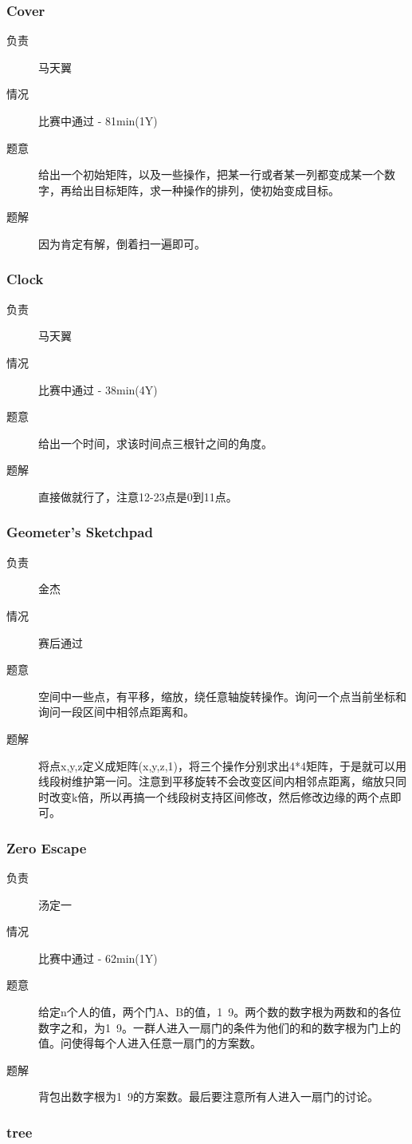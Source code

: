 \documentclass[a4paper, 11pt, nofonts, nocap, fancyhdr]{ctexart}
\newcommand{\problem}[1]{\subsubsection{#1}}
\begin{document}
\problem{Cover}

\begin{description}
\item[负责] 马天翼
\item[情况] 比赛中通过 - 81min(1Y)
\item[题意]
给出一个初始矩阵，以及一些操作，把某一行或者某一列都变成某一个数字，再给出目标矩阵，求一种操作的排列，使初始变成目标。
\item[题解]
因为肯定有解，倒着扫一遍即可。
\end{description}

\problem{Clock}

\begin{description}
\item[负责] 马天翼
\item[情况] 比赛中通过 - 38min(4Y)
\item[题意]
给出一个时间，求该时间点三根针之间的角度。
\item[题解]
直接做就行了，注意12-23点是0到11点。
\end{description}

\problem{Geometer's Sketchpad}

\begin{description}
\item[负责] 金杰
\item[情况] 赛后通过
\item[题意]
空间中一些点，有平移，缩放，绕任意轴旋转操作。询问一个点当前坐标和询问一段区间中相邻点距离和。
\item[题解]
将点x,y,z定义成矩阵(x,y,z,1)，将三个操作分别求出4*4矩阵，于是就可以用线段树维护第一问。注意到平移旋转不会改变区间内相邻点距离，缩放只同时改变k倍，所以再搞一个线段树支持区间修改，然后修改边缘的两个点即可。
\end{description}

\problem{Zero Escape}

\begin{description}
\item[负责] 汤定一
\item[情况] 比赛中通过 - 62min(1Y)
\item[题意]
给定n个人的值，两个门A、B的值，1~9。两个数的数字根为两数和的各位数字之和，为1~9。一群人进入一扇门的条件为他们的和的数字根为门上的值。问使得每个人进入任意一扇门的方案数。
\item[题解]
背包出数字根为1~9的方案数。最后要注意所有人进入一扇门的讨论。
\end{description}

\problem{tree}
\end{document}
